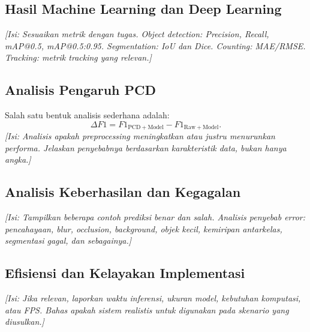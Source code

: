 \documentclass[10pt,twocolumn,a4paper]{article}
\newcommand{\isian}[1]{\textcolor{notegray}{\textit{[Isi: #1]}}}
\begin{document}
\subsection{Hasil Machine Learning dan Deep Learning}
\begin{table}[H]
\centering
\caption{Perbandingan hasil eksperimen utama.}
\label{tab:result}
\end{table}
\isian{Sesuaikan metrik dengan tugas. Object detection: Precision, Recall, mAP@0.5, mAP@0.5:0.95. Segmentation: IoU dan Dice. Counting: MAE/RMSE. Tracking: metrik tracking yang relevan.}

\subsection{Analisis Pengaruh PCD}
Salah satu bentuk analisis sederhana adalah:
\begin{equation}
\Delta F1 = F1_{\mathrm{PCD+Model}} - F1_{\mathrm{Raw+Model}}.
\end{equation}
\isian{Analisis apakah preprocessing meningkatkan atau justru menurunkan performa. Jelaskan penyebabnya berdasarkan karakteristik data, bukan hanya angka.}

\subsection{Analisis Keberhasilan dan Kegagalan}
\isian{Tampilkan beberapa contoh prediksi benar dan salah. Analisis penyebab error: pencahayaan, blur, occlusion, background, objek kecil, kemiripan antarkelas, segmentasi gagal, dan sebagainya.}

\subsection{Efisiensi dan Kelayakan Implementasi}
\isian{Jika relevan, laporkan waktu inferensi, ukuran model, kebutuhan komputasi, atau FPS. Bahas apakah sistem realistis untuk digunakan pada skenario yang diusulkan.}
\end{document}

